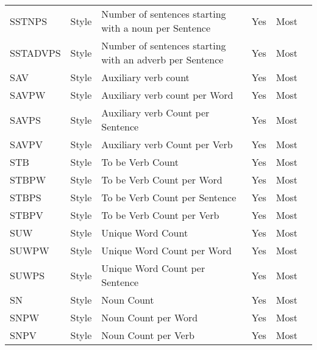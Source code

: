 \begin{longtable}{l l m{} c c m{}}
    SSTNPS & Style & Number of sentences starting with a noun per Sentence & Yes & Most & \cite{Bassani2019_lr359} \\
    SSTADVPS & Style & Number of sentences starting with an adverb per Sentence & Yes & Most & \cite{Bassani2019_lr359} \\
    SAV & Style & Auxiliary verb count & Yes & Most & \cite{Dalip2009_lr14, Wang2020_lr26, Wang2019_lr74, Bassani2019_lr359, Dalip2016_lr1002, Dalip2011_lr1003, Dalip2014_lr1004, Olcer2022_lr2017, Magalhaes2019_lr2028} \\
    SAVPW & Style & Auxiliary verb count per Word & Yes & Most & \cite{Anderka2012_lr17, Ferretti2012_lr115, Pereyra2019_lr147, Bassani2019_lr359} \\
    SAVPS & Style & Auxiliary verb Count per Sentence & Yes & Most & \cite{Bassani2019_lr359} \\
    SAVPV & Style & Auxiliary verb Count per Verb & Yes & Most & \cite{Bassani2019_lr359} \\
    STB & Style & To be Verb Count & Yes & Most & \cite{Bassani2019_lr359, Dalip2016_lr1002, Dalip2014_lr1004, Olcer2022_lr2017, Magalhaes2019_lr2028} \\
    STBPW & Style & To be Verb Count per Word & Yes & Most & \cite{Dalip2009_lr14, Anderka2012_lr17, Wang2020_lr26, Wang2019_lr74, Ferretti2012_lr115, Pereyra2019_lr147, Bassani2019_lr359, Dalip2011_lr1003} \\
    STBPS & Style & To be Verb Count per Sentence & Yes & Most & \cite{Bassani2019_lr359} \\
    STBPV & Style & To be Verb Count per Verb & Yes & Most & \cite{Bassani2019_lr359} \\
    SUW & Style & Unique Word Count & Yes & Most & \cite{Lewoniewski2018_lr149, Robertie2017_lr172, Bassani2019_lr359} \\
    SUWPW & Style & Unique Word Count per Word & Yes & Most & \cite{Xu2011_lr30, Su2015_lr128, Bassani2019_lr359} \\
    SUWPS & Style & Unique Word Count per Sentence & Yes & Most & \cite{Xu2011_lr30, Bassani2019_lr359} \\
    SN & Style & Noun Count & Yes & Most & \cite{Bassani2019_lr359, Olcer2022_lr2017} \\
    SNPW & Style & Noun Count per Word & Yes & Most & \cite{Xu2011_lr30, Bassani2019_lr359} \\
    SNPV & Style & Noun Count per Verb & Yes & Most & \cite{Lewoniewski2018_lr149} \\

\end{longtable}
